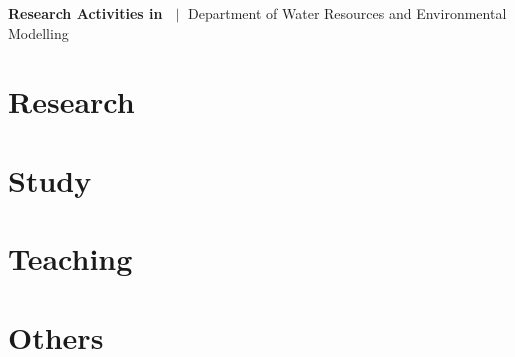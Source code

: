 \documentclass[11pt]{article}
\begin{document}
\thispagestyle{first_page}
\textbf{\textcolor{fzp_orange}{\fontsize{20}{30}\selectfont Research Activities in \theyear}}
\vskip 0.2in
\textcolor{fzp_orange}{\fontsize{14}{21}\selectfont \yourname $\;\mid$ Department of Water Resources and Environmental Modelling}
\section{\textcolor{fzp_green}{Research}}

\section{\textcolor{fzp_green}{Study}}

\section{\textcolor{fzp_green}{Teaching}}

\section{\textcolor{fzp_green}{Others}}

\end{document}
